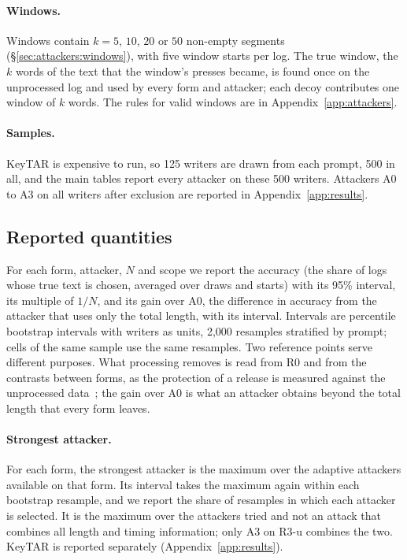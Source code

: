 \paragraph{Windows.}
Windows contain $k = 5$, $10$, $20$ or $50$ non-empty segments (\S\ref{sec:attackers:windows}), with five window starts
per log. The true window, the $k$ words of the text that the window's presses became, is found once on the unprocessed
log and used by every form and attacker; each decoy contributes one window of $k$ words. The rules for valid windows
are in Appendix~\ref{app:attackers}.

\paragraph{Samples.}
KeyTAR is expensive to run, so 125 writers are drawn from each prompt, 500 in all, and the main tables report every
attacker on these 500 writers. Attackers A0 to A3 on all writers after exclusion are reported in Appendix~\ref{app:results}.

\subsection{Reported quantities}
\label{sec:protocol:quantities}

For each form, attacker, $N$ and scope we report the accuracy (the share of logs whose true text is chosen, averaged
over draws and starts) with its 95\% interval, its multiple of $1/N$, and its gain over A0, the difference in accuracy
from the attacker that uses only the total length, with its interval. Intervals are percentile bootstrap intervals with
writers as units, 2,000 resamples stratified by prompt; cells of the same sample use the same resamples. Two
reference points serve different purposes. What processing removes is read from R0 and from the contrasts between
forms, as the protection of a release is measured against the unprocessed data~\cite{stadler2022synthetic}; the gain
over A0 is what an attacker obtains beyond the total length that every form leaves.

\paragraph{Strongest attacker.}
For each form, the strongest attacker is the maximum over the adaptive attackers available on that form. Its interval
takes the maximum again within each bootstrap resample, and we report the share of resamples in which each attacker is
selected. It is the maximum over the attackers tried and not an attack that combines all length and timing information;
only A3 on R3-u combines the two. KeyTAR is reported separately (Appendix~\ref{app:results}).

